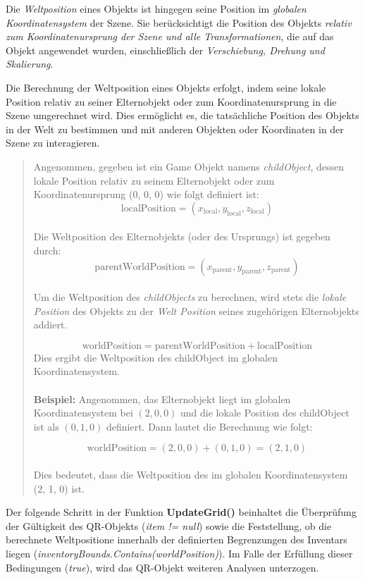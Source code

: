 Die \textit{Weltposition} eines Objekts ist hingegen seine Position im \textit{globalen Koordinatensystem} der Szene. Sie
berücksichtigt die Position des Objekts \textit{relativ zum Koordinatenursprung der Szene und alle Transformationen},
die auf das Objekt angewendet wurden, einschließlich der \textit{Verschiebung, Drehung und Skalierung}.

Die Berechnung der Weltposition eines Objekts erfolgt, indem seine lokale Position relativ zu seiner Elternobjekt oder
zum Koordinatenursprung in die Szene umgerechnet wird. Dies ermöglicht es, die tatsächliche Position des Objekts in der
Welt zu bestimmen und mit anderen Objekten oder Koordinaten in der Szene zu interagieren.

\begin{quote}
Angenommen, gegeben ist ein Game Objekt namens \textit{childObject}, dessen lokale Position relativ zu seinem Elternobjekt
oder zum Koordinatenursprung (0, 0, 0) wie folgt definiert ist:
\[
\text{localPosition} = (x_{\text{local}}, y_{\text{local}}, z_{\text{local}})
\]
\\
Die Weltposition des Elternobjekts (oder des Ursprungs) ist gegeben durch:
\[
\text{parentWorldPosition} = (x_{\text{parent}}, y_{\text{parent}}, z_{\text{parent}})
\]
\\
Um die Weltposition des \textit{childObjects} zu berechnen, wird stets die \textit{lokale Position} des Objekts zu der
\textit{Welt Position} seines zugehörigen Elternobjekts addiert.

\[
\text{worldPosition} = \text{parentWorldPosition} + \text{localPosition}
\]
Dies ergibt die Weltposition des childObject im globalen Koordinatensystem.
\\
\\
\textbf{Beispiel:}
Angenommen, das Elternobjekt liegt im globalen Koordinatensystem bei $(2, 0, 0)$ und die lokale Position des childObject
ist als $(0, 1, 0)$ definiert. Dann lautet die Berechnung wie folgt:

\[
\text{worldPosition} = (2, 0, 0) + (0, 1, 0) = (2, 1, 0)
\]
\\
Dies bedeutet, dass die Weltposition des  im globalen Koordinatensystem (2, 1, 0) ist.\\
\end{quote}

Der folgende Schritt in der Funktion \textbf{UpdateGrid()} beinhaltet die Überprüfung der Gültigkeit des QR-Objekts
(\textit{item != null}) sowie die Feststellung, ob die berechnete Weltpositione innerhalb der definierten Begrenzungen
des Inventars liegen (\textit{inventoryBounds.Contains(worldPosition)}). Im Falle der Erfüllung dieser Bedingungen
(\textit{true}), wird das QR-Objekt weiteren Analysen unterzogen.

